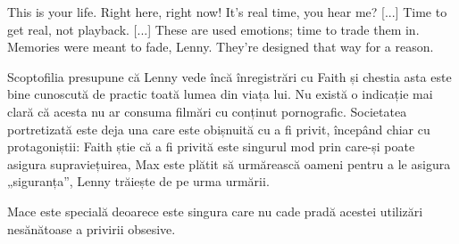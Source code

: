 \documentclass[12pt]{article}
\begin{document}
\begin{displayquote}
	This is your life. Right here, right now! It’s real time, you hear me? [...] Time to get real, not playback. [...] These are used emotions; time to trade them in. Memories were meant to fade, Lenny. They’re designed that way for a reason.
\end{displayquote}

Scoptofilia presupune că Lenny vede încă înregistrări cu Faith și chestia asta este bine cunoscută de practic toată lumea din viața lui. Nu există o indicație mai clară că acesta nu ar consuma filmări cu conținut pornografic. Societatea portretizată este deja una care este obișnuită cu a fi privit, începând chiar cu protagoniștii: Faith știe că a fi privită este singurul mod prin care-și poate asigura supraviețuirea, Max este plătit să urmărească oameni pentru a le asigura „siguranța”, Lenny trăiește de pe urma urmării.\par

Mace este specială deoarece este singura care nu cade pradă acestei utilizări nesănătoase a privirii obsesive.
\printbibliography
\end{document}
